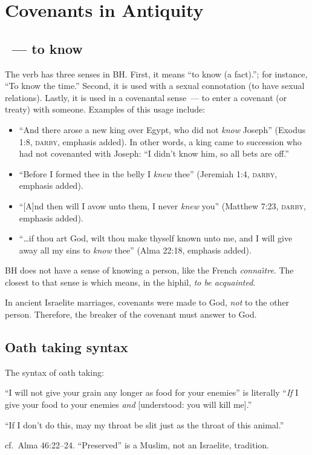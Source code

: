 \section{Covenants in Antiquity}\label{app:covenants-in-antiquity}\thispagestyle{fancy}
\subsection{~--- to know}
The verb  has three senses in BH. First, it means ``to know (a fact).''; for instance, ``To know the time.'' Second, it is used with a sexual connotation (to have sexual relations). Lastly, it is used in a covenantal sense~--- to enter a covenant (or treaty) with someone. Examples of this usage include:
\begin{itemize}
    \item ``And there arose a new king over Egypt, who did not \emph{know} Joseph'' (Exodus 1:8, \textsc{darby}, emphasis added). In other words, a king came to succession who had not covenanted with Joseph: ``I didn't know him, so all bets are off.''
    \item ``Before I formed thee in the belly I \emph{knew} thee'' (Jeremiah 1:4, \textsc{darby}, emphasis added).
    \item ``[A]nd then will I avow unto them, I never \emph{knew} you'' (Matthew 7:23, \textsc{darby}, emphasis added).
    \item ``\dots if thou art God, wilt thou make thyself known unto me, and I will give away all my sins to \emph{know} thee'' (Alma 22:18, emphasis added).
\end{itemize}

BH does not have a sense of knowing a person, like the French \emph{conna\^\i tre}. The closest to that sense is  which means, in the hiphil, \emph{to be acquainted}.

In ancient Israelite marriages, covenants were made to God, \emph{not} to the other person. Therefore, the breaker of the covenant must answer to God.

\subsection{Oath taking syntax}
The syntax of oath taking:

``I will not give your grain any longer as food for your enemies'' is literally ``\emph{If} I give your food to your enemies \emph{and} [understood: you will kill me].''

``If I don't do this, may my throat be slit just as the throat of this animal.''

cf.\ Alma 46:22--24. ``Preserved'' is a Muslim, not an Israelite, tradition.
